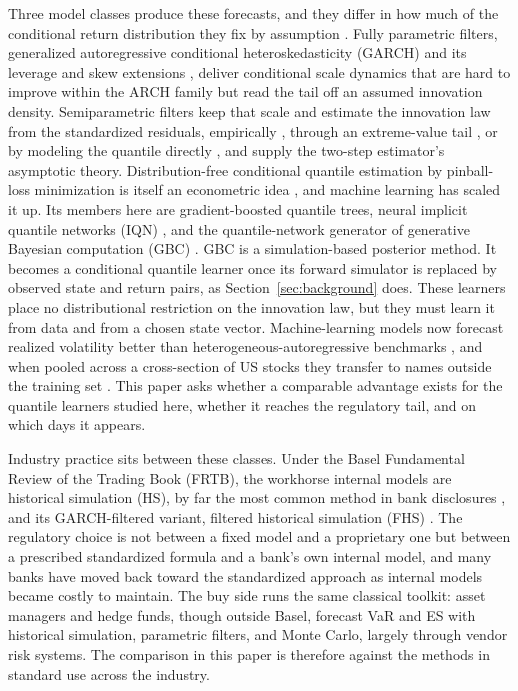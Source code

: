 \documentclass[11pt]{article}
\theoremstyle{remark}
\begin{document}
Three
model classes produce these forecasts, and they differ in how much of
the conditional return distribution they fix by assumption
\citep{kuester2006, nietoruiz2016}. Fully parametric filters, generalized autoregressive conditional heteroskedasticity (GARCH) and
its leverage and skew extensions \citep{bollerslev1986, glosten1993},
deliver conditional scale dynamics that are hard to improve within the
ARCH family \citep{hansenlunde2005} but read the tail off an assumed
innovation density. Semiparametric filters keep that scale and estimate
the innovation law from the standardized residuals, empirically
\citep{baroneadesi1999fhs}, through an extreme-value tail
\citep{mcneilfrey2000}, or by modeling the quantile directly
\citep{engle2004caviar}, and \citet{francqzakoian2015} supply the
two-step estimator's asymptotic theory. Distribution-free conditional
quantile estimation by pinball-loss minimization is itself an
econometric idea \citep{koenker1978}, and machine learning has scaled
it up. Its members here are gradient-boosted quantile trees, neural
implicit quantile networks (IQN) \citep{dabney2018iqn}, and the
quantile-network generator of generative Bayesian computation (GBC)
\citep{polson2023gbc}. GBC is a simulation-based posterior method. It
becomes a conditional quantile learner once its forward simulator is
replaced by observed state and return pairs, as
Section~\ref{sec:background} does. These learners place no distributional restriction on the
innovation law, but they must learn it from data and from a chosen
state vector. Machine-learning models now forecast realized volatility better than
heterogeneous-autoregressive benchmarks \citep{bucci2020,
christensen2023ml}, and when pooled across a cross-section of US stocks
they transfer to names outside the training set
\citep{zhang2024commonality}. This paper asks whether a comparable advantage exists for
the quantile learners studied here, whether it reaches the regulatory
tail, and on which days it appears.

Industry practice sits between these classes. Under the Basel Fundamental Review of the Trading Book (FRTB), the workhorse internal models are historical simulation (HS), by far the most common method in bank disclosures \citep{perignonsmith2010}, and its GARCH-filtered variant, filtered historical simulation (FHS) \citep{baroneadesi1999fhs}. The regulatory choice is not between a fixed model and a proprietary one but between a prescribed standardized formula and a bank's own internal model, and many banks have moved back toward the standardized approach as internal models became costly to maintain. The buy side runs the same classical toolkit: asset managers and hedge funds, though outside Basel, forecast VaR and ES with historical simulation, parametric filters, and Monte Carlo, largely through vendor risk systems. The comparison in this paper is therefore against the methods in standard use across the industry.
\end{document}
